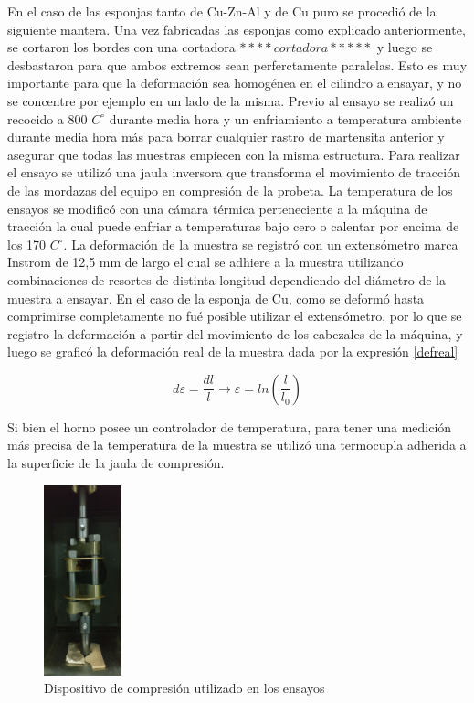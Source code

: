 \documentclass[a4paper,12pt,fleqn,twoside,openany]{book}
\begin{document}
En el caso de las esponjas tanto de Cu-Zn-Al y de Cu puro se procedió de la siguiente mantera. Una vez fabricadas las esponjas como explicado anteriormente, 
se cortaron los bordes con una cortadora $****cortadora*****$ y luego se desbastaron para que ambos extremos sean perferctamente paralelas. Esto es muy 
importante para que la deformación sea homogénea en el cilindro a ensayar, y no se concentre por ejemplo en un lado de la misma. 
Previo al ensayo se realizó un recocido a 800 $C^\circ$ durante media hora y un enfriamiento a temperatura ambiente durante media hora más para borrar cualquier 
rastro de martensita anterior y asegurar que todas las muestras empiecen con la misma estructura. 
Para realizar el ensayo se utilizó una jaula inversora que transforma el movimiento de tracción de las mordazas del equipo en compresión de la probeta. La 
temperatura de los ensayos se modificó con una cámara térmica perteneciente a la máquina de tracción la cual puede enfriar a temperaturas bajo cero o 
calentar por encima de los 170 $C^\circ$.
La deformación de la muestra se registró con un extensómetro marca Instrom de 12,5 mm de largo el cual se adhiere a la muestra utilizando combinaciones de 
resortes de distinta longitud dependiendo del diámetro de la muestra a ensayar. En el caso de la esponja de Cu, como se deformó hasta comprimirse 
completamente no fué posible utilizar el extensómetro, por lo que se registro la deformación a partir del movimiento de los cabezales de la máquina, y luego 
se graficó la deformación real de la muestra dada por la expresión \ref{defreal}

\begin{equation}
d \varepsilon = \frac{dl}{l}  \longrightarrow  \varepsilon =ln \left(\frac{l}{l_0}\right) \label{defreal} 
\end{equation}

Si bien el horno posee un controlador de temperatura, para tener una medición
más precisa de la temperatura de la muestra se utilizó una termocupla adherida a la superficie de la jaula de compresión.


\begin{figure}[h]
 \centering
 \includegraphics[width=0.2\textwidth]{Img/Procedimiento/jaula.jpg}
 \caption{Dispositivo de compresión utilizado en los ensayos} 
 \label{fig:jaula}
 \end{figure}
\end{document}
